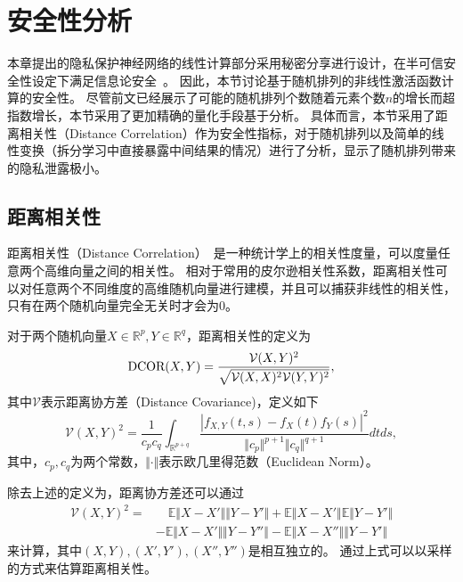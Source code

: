 \section{安全性分析}
本章提出的隐私保护神经网络的线性计算部分采用秘密分享进行设计，在半可信安全性设定下满足信息论安全~\cite{demmler2015aby}。
%
因此，本节讨论基于随机排列的非线性激活函数计算的安全性。
%
尽管前文已经展示了可能的随机排列个数随着元素个数$n$的增长而超指数增长，本节采用了更加精确的量化手段基于分析。
%
具体而言，本节采用了距离相关性（Distance Correlation）作为安全性指标，对于随机排列以及简单的线性变换（拆分学习中直接暴露中间结果的情况）进行了分析，显示了随机排列带来的隐私泄露极小。

\subsection{距离相关性}
距离相关性（Distance Correlation）~\cite{szekely2007dcor,szekely2009brownian_dcor}是一种统计学上的相关性度量，可以度量任意两个高维向量之间的相关性。
相对于常用的皮尔逊相关性系数，距离相关性可以对任意两个不同维度的高维随机向量进行建模，并且可以捕获非线性的相关性，只有在两个随机向量完全无关时才会为0。
%
\begin{definition}[距离相关性]
    对于两个随机向量$X \in \mathbb R^p, Y\in \mathbb R^q$，距离相关性的定义为
    \begin{equation}
        \textnormal{DCOR}(X, Y) = \dfrac{\mathcal{V}(X, Y)^2}{\sqrt{\mathcal{V}(X, X)^2\mathcal{V}(Y, Y)^2}},
    \end{equation}
    其中$\mathcal{V}$表示距离协方差（Distance Covariance)，定义如下
    \begin{equation}
        \mathcal{V}(X, Y)^2 = \dfrac{1}{c_pc_q} \int_{\mathbb R^{p + q}}
        \dfrac{|f_{X, Y}(t, s) - f_X(t)f_Y(s)|^2}{\Vert c_p \Vert^{p+1}\Vert c_q \Vert^{q+1}}dtds,
    \end{equation}
    其中，$c_p, c_q$为两个常数，$\Vert \cdot \Vert$表示欧几里得范数（Euclidean Norm）。
\end{definition}

除去上述的定义为，距离协方差还可以通过
\begin{equation}
\begin{split}
    \mathcal{V}(X, Y)^2 = 
    & \quad \mathbb E \Vert X-X'\Vert \Vert Y -Y'\Vert +\mathbb E\Vert X -X' \Vert \mathbb E \Vert Y -Y' \Vert
    \\ & 
    - \mathbb E\Vert X-X'\Vert  \Vert Y -Y''\Vert - \mathbb E \Vert X -X''\Vert  \Vert Y -Y' \Vert
\end{split}
\end{equation}
来计算，其中$(X, Y), (X', Y'), (X'', Y'')$是相互独立的。
%
通过上式可以以采样的方式来估算距离相关性。

